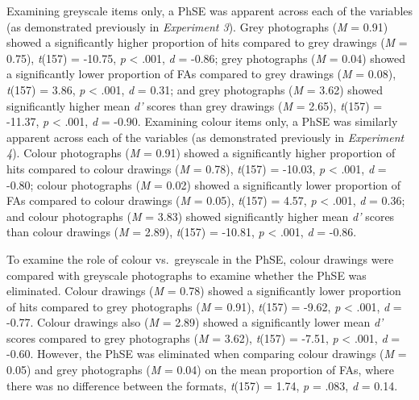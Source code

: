 \documentclass[
  11pt,
]{article}
\begin{document}
Examining greyscale items only, a PhSE was apparent across each of the
variables (as demonstrated previously in \emph{Experiment 3}). Grey
photographs (\emph{M} = 0.91) showed a significantly higher proportion
of hits compared to grey drawings (\emph{M} = 0.75), \emph{t}(157) =
-10.75, \emph{p} \textless{} .001, \emph{d} = -0.86; grey photographs
(\emph{M} = 0.04) showed a significantly lower proportion of FAs
compared to grey drawings (\emph{M} = 0.08), \emph{t}(157) = 3.86,
\emph{p} \textless{} .001, \emph{d} = 0.31; and grey photographs
(\emph{M} = 3.62) showed significantly higher mean \emph{d'} scores than
grey drawings (\emph{M} = 2.65), \emph{t}(157) = -11.37, \emph{p}
\textless{} .001, \emph{d} = -0.90. Examining colour items only, a PhSE
was similarly apparent across each of the variables (as demonstrated
previously in \emph{Experiment 4}). Colour photographs (\emph{M} = 0.91)
showed a significantly higher proportion of hits compared to colour
drawings (\emph{M} = 0.78), \emph{t}(157) = -10.03, \emph{p} \textless{}
.001, \emph{d} = -0.80; colour photographs (\emph{M} = 0.02) showed a
significantly lower proportion of FAs compared to colour drawings
(\emph{M} = 0.05), \emph{t}(157) = 4.57, \emph{p} \textless{} .001,
\emph{d} = 0.36; and colour photographs (\emph{M} = 3.83) showed
significantly higher mean \emph{d'} scores than colour drawings
(\emph{M} = 2.89), \emph{t}(157) = -10.81, \emph{p} \textless{} .001,
\emph{d} = -0.86.

To examine the role of colour vs.~greyscale in the PhSE, colour drawings
were compared with greyscale photographs to examine whether the PhSE was
eliminated. Colour drawings (\emph{M} = 0.78) showed a significantly
lower proportion of hits compared to grey photographs (\emph{M} = 0.91),
\emph{t}(157) = -9.62, \emph{p} \textless{} .001, \emph{d} = -0.77.
Colour drawings also (\emph{M} = 2.89) showed a significantly lower mean
\emph{d'} scores compared to grey photographs (\emph{M} = 3.62),
\emph{t}(157) = -7.51, \emph{p} \textless{} .001, \emph{d} = -0.60.
However, the PhSE was eliminated when comparing colour drawings
(\emph{M} = 0.05) and grey photographs (\emph{M} = 0.04) on the mean
proportion of FAs, where there was no difference between the formats,
\emph{t}(157) = 1.74, \emph{p} = .083, \emph{d} = 0.14.
\end{document}
